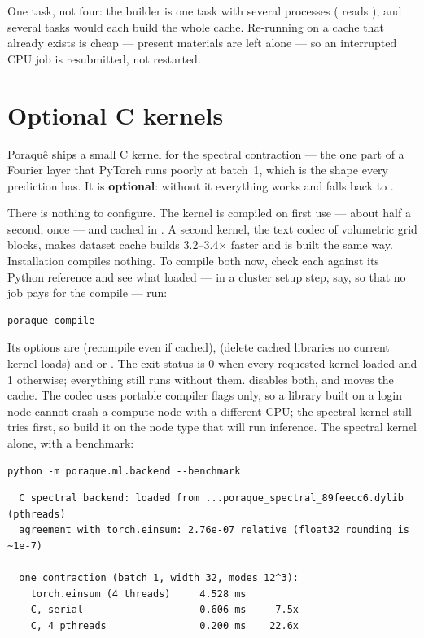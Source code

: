 One task, not four: the builder is one task with several processes
( reads ), and several tasks
would each build the whole cache. Re-running  on a cache that
already exists is cheap --- present materials are left alone --- so an
interrupted CPU job is resubmitted, not restarted.

\section{Optional C kernels}
\label{sec:cbackend}

Poraqu\^e ships a small C kernel for the spectral contraction --- the one part
of a Fourier layer that PyTorch runs poorly at batch~1, which is the shape
every prediction has. It is \textbf{optional}: without it everything works and
falls back to .

There is nothing to configure. The kernel is compiled on first use --- about
half a second, once --- and cached in .
A second kernel, the text codec of volumetric grid blocks, makes dataset cache
builds 3.2--3.4$\times$ faster and is built the same way. Installation compiles
nothing. To compile both now, check each against its Python reference and see
what loaded --- in a cluster setup step, say, so that no job pays for the
compile --- run:

\begin{lstlisting}
poraque-compile
\end{lstlisting}

\noindent Its options are  (recompile even if cached),
 (delete cached libraries no current kernel loads) and
 or . The exit status is 0 when every
requested kernel loaded and 1 otherwise; everything still runs without them.
 disables both, and 
moves the cache. The codec uses portable compiler flags only, so a library built
on a login node cannot crash a compute node with a different CPU; the spectral
kernel still tries  first, so build it on the node type that
will run inference. The spectral kernel alone, with a benchmark:

\begin{lstlisting}
python -m poraque.ml.backend --benchmark
\end{lstlisting}

\begin{lstlisting}
  C spectral backend: loaded from ...poraque_spectral_89feecc6.dylib (pthreads)
  agreement with torch.einsum: 2.76e-07 relative (float32 rounding is ~1e-7)

  one contraction (batch 1, width 32, modes 12^3):
    torch.einsum (4 threads)     4.528 ms
    C, serial                    0.606 ms     7.5x
    C, 4 pthreads                0.200 ms    22.6x
\end{lstlisting}

